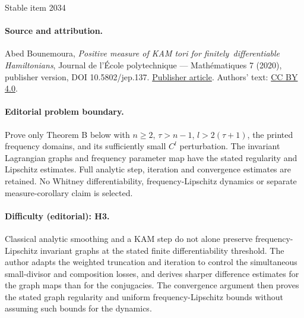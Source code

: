 \documentclass[11pt]{article}
\begin{document}
\begin{center}{\Large Stable item 2034}\end{center}
\paragraph{Source and attribution.}
Abed Bounemoura, \emph{Positive measure of KAM tori for finitely differentiable Hamiltonians}, Journal de l’École polytechnique — Mathématiques 7 (2020), publisher version, DOI 10.5802/jep.137. \href{https://jep.centre-mersenne.org/articles/10.5802/jep.137/}{Publisher article}. Authors' text: \href{https://creativecommons.org/licenses/by/4.0/}{CC BY 4.0}.
\paragraph{Editorial problem boundary.}
Prove only Theorem B below with \(n\ge2\), \(\tau>n-1\), \(l>2(\tau+1)\), the printed frequency domains, and its sufficiently small \(C^l\) perturbation. The invariant Lagrangian graphs and frequency parameter map have the stated regularity and Lipschitz estimates. Full analytic step, iteration and convergence estimates are retained. No Whitney differentiability, frequency-Lipschitz dynamics or separate measure-corollary claim is selected.
\paragraph{Difficulty (editorial): H3.}
Classical analytic smoothing and a KAM step do not alone preserve frequency-Lipschitz invariant graphs at the stated finite differentiability threshold. The author adapts the weighted truncation and iteration to control the simultaneous small-divisor and composition losses, and derives sharper difference estimates for the graph maps than for the conjugacies. The convergence argument then proves the stated graph regularity and uniform frequency-Lipschitz bounds without assuming such bounds for the dynamics.
\end{document}
